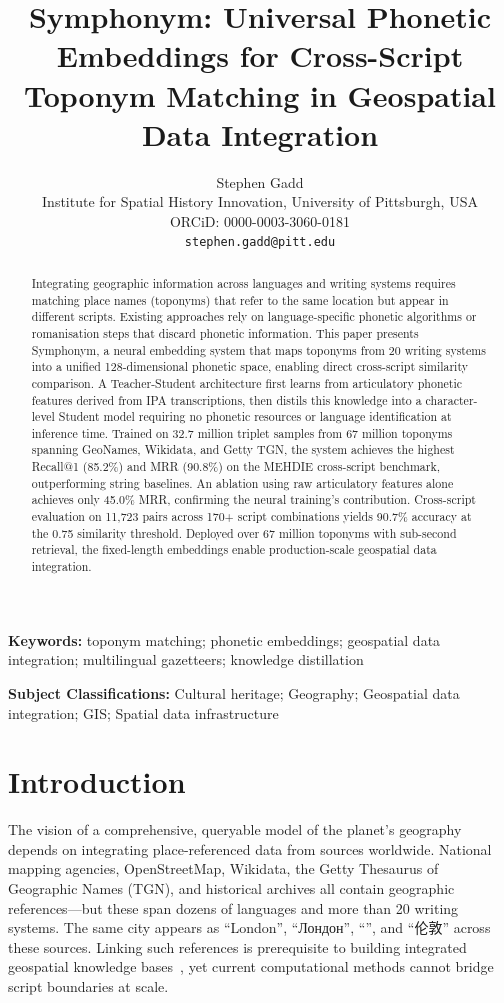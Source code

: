 \documentclass[11pt,a4paper]{article}
\title{Symphonym: Universal Phonetic Embeddings for Cross-Script Toponym Matching in Geospatial Data Integration}
\author{Stephen Gadd\\
\small Institute for Spatial History Innovation, University of Pittsburgh, USA\\
\small ORCiD: 0000-0003-3060-0181\\
\small \texttt{stephen.gadd@pitt.edu}}
\date{}
\newcommand{\textar}[1]{{\arabicfont\RL{#1}}}
\newcommand{\textcn}[1]{{\chinesefont #1}}
\begin{document}
\maketitle

\begin{abstract}
Integrating geographic information across languages and writing systems requires matching place names (toponyms) that refer to the same location but appear in different scripts. Existing approaches rely on language-specific phonetic algorithms or romanisation steps that discard phonetic information. This paper presents Symphonym, a neural embedding system that maps toponyms from 20 writing systems into a unified 128-dimensional phonetic space, enabling direct cross-script similarity comparison. A Teacher-Student architecture first learns from articulatory phonetic features derived from IPA transcriptions, then distils this knowledge into a character-level Student model requiring no phonetic resources or language identification at inference time. Trained on 32.7 million triplet samples from 67 million toponyms spanning GeoNames, Wikidata, and Getty TGN, the system achieves the highest Recall@1 (85.2\%) and MRR (90.8\%) on the MEHDIE cross-script benchmark, outperforming string baselines. An ablation using raw articulatory features alone achieves only 45.0\% MRR, confirming the neural training's contribution. Cross-script evaluation on 11,723 pairs across 170+ script combinations yields 90.7\% accuracy at the 0.75 similarity threshold. Deployed over 67 million toponyms with sub-second retrieval, the fixed-length embeddings enable production-scale geospatial data integration.
\end{abstract}

\textbf{Keywords:} toponym matching; phonetic embeddings; geospatial data integration; multilingual gazetteers; knowledge distillation

\noindent\textbf{Subject Classifications:} Cultural heritage; Geography; Geospatial data integration; GIS; Spatial data infrastructure


\section{Introduction}
\label{sec:introduction}

The vision of a comprehensive, queryable model of the planet's geography~\citep{goodchild2012digital,guo2020digital} depends on integrating place-referenced data from sources worldwide. National mapping agencies, OpenStreetMap, Wikidata, the Getty Thesaurus of Geographic Names (TGN), and historical archives all contain geographic references---but these span dozens of languages and more than 20 writing systems. The same city appears as ``London'', ``Лондон'', ``\textar{لندن}'', and ``\textcn{伦敦}'' across these sources. Linking such references is prerequisite to building integrated geospatial knowledge bases~\citep{hill2006georeferencing}, yet current computational methods cannot bridge script boundaries at scale.
\end{document}
